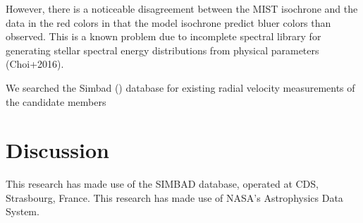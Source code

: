 \documentclass[modern,letterpaper]{aastex61}
\newcommand{\todo}[1]{{\color{blue}TODO:#1}}
\begin{document}
However, there is a noticeable disagreement between the MIST isochrone and the
data in the red colors in that the model isochrone predict bluer colors than
observed. This is a known problem due to incomplete spectral library for
generating stellar spectral energy distributions from physical parameters
(Choi+2016).


We searched the Simbad (\citealt{2000A&AS..143....9W}) database for existing
radial velocity measurements of the candidate members


\section{Discussion}
\label{sec:discussion}

% 



\acknowledgements
This research has made use of the SIMBAD database,
operated at CDS, Strasbourg, France.
This research has made use of NASA's Astrophysics Data System.



\end{document}
